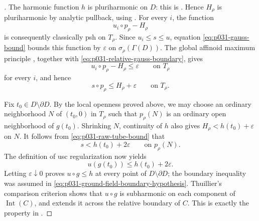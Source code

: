 \begin{proof}[
]
The harmonic function $h$ is pluriharmonic on $D$: this is
\cite[Definition~3.13 and \S4.1.2]{GR25Classical}.  Hence $H_\rho$ is
pluriharmonic by analytic pullback, using
\cite[Proposition~7.2(7)]{GR25Classical}.  For every $i$, the function
\[
                         u_i\circ p_\rho-H_\rho
\]
is consequently classically psh on $T_\rho$.  Since
$u_i\leq s\leq u$, equation \eqref{eq:p031-gauss-bound} bounds this
function by $\varepsilon$ on $\sigma_\rho(\Gamma(D))$.  The global
affinoid maximum principle \cite[Theorem~6.4]{GR25Classical}, together
with \eqref{eq:p031-relative-gauss-boundary}, gives
\[
                    u_i\circ p_\rho-H_\rho\leq\varepsilon
                    \qquad\text{on }T_\rho
\]
for every $i$, and hence
\begin{equation}
\label{eq:p031-raw-tube-bound}
                    s\circ p_\rho\leq H_\rho+\varepsilon
                    \qquad\text{on }T_\rho.
\end{equation}

Fix $t_0\in D\setminus\partial D$.  By the local openness proved above,
we may choose an ordinary neighborhood $N$ of $(t_0,0)$ in $T_\rho$
such that $p_\rho(N)$ is an ordinary open neighborhood of $g(t_0)$.
Shrinking $N$, continuity of $h$ also gives
$H_\rho<h(t_0)+\varepsilon$ on $N$.  It follows from
\eqref{eq:p031-raw-tube-bound} that
\[
                    s<h(t_0)+2\varepsilon
                    \qquad\text{on }p_\rho(N).
\]
The definition of usc regularization now yields
\[
                         u(g(t_0))\leq h(t_0)+2\varepsilon.
\]
Letting $\varepsilon\downarrow0$ proves $u\circ g\leq h$ at every
point of $D\setminus\partial D$; the boundary inequality was assumed in
\eqref{eq:p031-ground-field-boundary-hypothesis}.  Thuillier's comparison criterion
shows that $u\circ g$ is subharmonic on each component of
$\operatorname{Int}(C)$, and
\cite[Proposition~3.5(3)]{GR25Classical} extends it across the relative
boundary of $C$.  This is exactly the property in
.
\end{proof}

